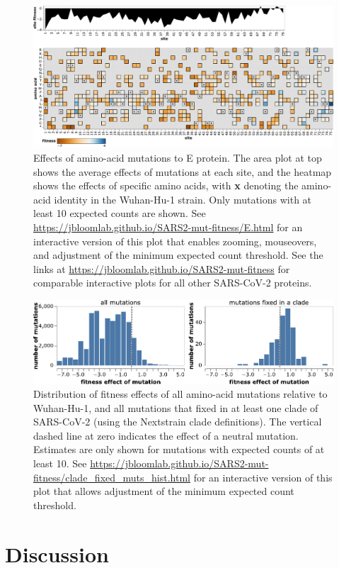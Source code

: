 \documentclass[9pt,twocolumn,twoside]{gsajnl_modified}
\begin{document}
\begin{figure}
\includegraphics[width=\linewidth]{figs/E_heatmap.pdf}
\caption{
Effects of amino-acid mutations to E protein.
The area plot at top shows the average effects of mutations at each site, and the heatmap shows the effects of specific amino acids, with \textbf{x} denoting the amino-acid identity in the Wuhan-Hu-1 strain.
Only mutations with at least 10 expected counts are shown.
See \url{https://jbloomlab.github.io/SARS2-mut-fitness/E.html} for an interactive version of this plot that enables zooming, mouseovers, and adjustment of the minimum expected count threshold.
See the links at \url{https://jbloomlab.github.io/SARS2-mut-fitness} for comparable interactive plots for all other SARS-CoV-2 proteins.
\label{fig:E_heatmap}
}
\end{figure}

\begin{figure}
\centering
\includegraphics[width=0.7\linewidth]{figs/fixed_dist.pdf}
\caption{
Distribution of fitness effects of all amino-acid mutations relative to Wuhan-Hu-1, and all mutations that fixed in at least one clade of SARS-CoV-2 (using the Nextstrain clade definitions).
The vertical dashed line at zero indicates the effect of a neutral mutation.
Estimates are only shown for mutations with expected counts of at least 10.
See \url{https://jbloomlab.github.io/SARS2-mut-fitness/clade_fixed_muts_hist.html} for an interactive version of this plot that allows adjustment of the minimum expected count threshold.
\label{fig:fixed_dist}
}
\end{figure}

\section{Discussion}
\end{document}
